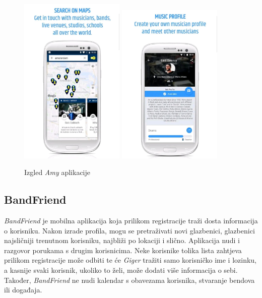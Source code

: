 		\begin{figure}[H]
			\begin{center}
				\includegraphics[width=5cm]{slike/Amy.JPEG}
			\includegraphics[width=5cm]{slike/Amy2.JPEG}
			\end{center}
			\caption{Izgled \textit{Amy} aplikacije}
			\label{fig:promjene2}
		\end{figure}
		
		
		
	    \subsection{BandFriend}
		
		\textit{BandFriend} je mobilna aplikacija koja prilikom registracije traži dosta informacija o korisniku. Nakon izrade profila, mogu se pretraživati novi glazbenici, glazbenici najsličniji trenutnom korisniku, najbliži po lokaciji i slično. Aplikacija nudi i razgovor porukama s drugim korisnicima. Neke korisnike tolika lista zahtjeva prilikom registracije može odbiti te će \textit{Giger} tražiti samo korisničko ime i lozinku, a kasnije svaki korisnik, ukoliko to želi, može dodati više informacija o sebi. Također, \textit{BandFriend} ne nudi kalendar s obavezama korisnika, stvaranje bendova ili događaja.
		\\
		
